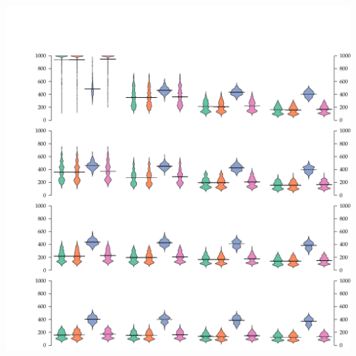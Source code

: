 \documentclass{article}
\newenvironment{knitrout}{}{} %
\begin{document}
\begin{knitrout}
\includegraphics[width=.9\textwidth]{figure/MegaFig1} \hfill{}


\end{knitrout}
\end{document}
